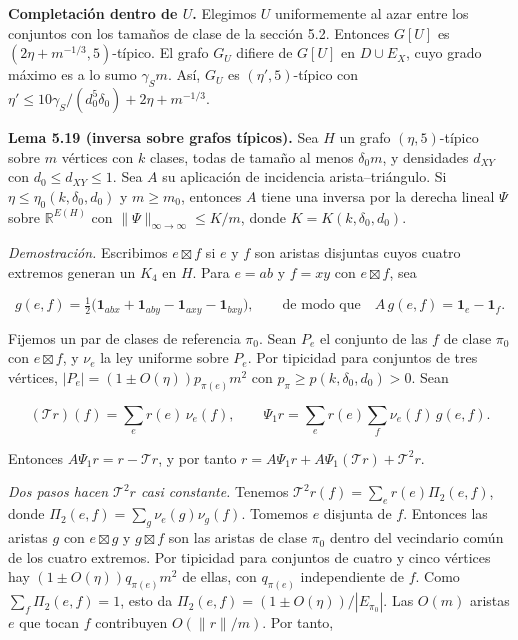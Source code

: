 \documentclass[spanish,11pt,a4paper]{article}
\begin{document}
\textbf{Completación dentro de \(U\).} Elegimos \(U\) uniformemente al azar entre los conjuntos con los tamaños de clase de la sección 5.2. Entonces \(G[U]\) es \((2\eta+m^{-1/3},5)\)-típico. El grafo \(G_U\) difiere de \(G[U]\) en \(D\cup E_X\), cuyo grado máximo es a lo sumo \(\gamma_Sm\). Así, \(G_U\) es \((\eta',5)\)-típico con \(\eta'\le10\gamma_S/(d_0^5\delta_0)+2\eta+m^{-1/3}\).

\textbf{Lema 5.19 (inversa sobre grafos típicos).} Sea \(H\) un grafo \((\eta,5)\)-típico sobre \(m\) vértices con \(k\) clases, todas de tamaño al menos \(\delta_0m\), y densidades \(d_{XY}\) con \(d_0\le d_{XY}\le1\). Sea \(A\) su aplicación de incidencia arista--triángulo. Si \(\eta\le\eta_0(k,\delta_0,d_0)\) y \(m\ge m_0\), entonces \(A\) tiene una inversa por la derecha lineal \(\Psi\) sobre \(\mathbb R^{E(H)}\) con \(\|\Psi\|_{\infty\to\infty}\le K/m\), donde \(K=K(k,\delta_0,d_0)\).

\emph{Demostración.} Escribimos \(e\boxtimes f\) si \(e\) y \(f\) son aristas disjuntas cuyos cuatro extremos generan un \(K_4\) en \(H\). Para \(e=ab\) y \(f=xy\) con \(e\boxtimes f\), sea

\nopagebreak[4]
\[g(e,f)=\tfrac12\bigl(\mathbf 1_{abx}+\mathbf 1_{aby}-\mathbf 1_{axy}-\mathbf 1_{bxy}\bigr),\qquad\text{de modo que}\quad A\,g(e,f)=\mathbf 1_e-\mathbf 1_f.\]

Fijemos un par de clases de referencia \(\pi_0\). Sean \(P_e\) el conjunto de las \(f\) de clase \(\pi_0\) con \(e\boxtimes f\), y \(\nu_e\) la ley uniforme sobre \(P_e\). Por tipicidad para conjuntos de tres vértices, \(|P_e|=(1\pm O(\eta))p_{\pi(e)}m^2\) con \(p_\pi\ge p(k,\delta_0,d_0)>0\). Sean

\nopagebreak[4]
\[(\mathcal Tr)(f)=\sum_e r(e)\,\nu_e(f),\qquad \Psi_1r=\sum_e r(e)\sum_f\nu_e(f)\,g(e,f).\]

Entonces \(A\Psi_1r=r-\mathcal Tr\), y por tanto \(r=A\Psi_1r+A\Psi_1(\mathcal Tr)+\mathcal T^2r\).

\emph{Dos pasos hacen \(\mathcal T^2r\) casi constante.} Tenemos \(\mathcal T^2r(f)=\sum_e r(e)\Pi_2(e,f)\), donde \(\Pi_2(e,f)=\sum_g\nu_e(g)\nu_g(f)\). Tomemos \(e\) disjunta de \(f\). Entonces las aristas \(g\) con \(e\boxtimes g\) y \(g\boxtimes f\) son las aristas de clase \(\pi_0\) dentro del vecindario común de los cuatro extremos. Por tipicidad para conjuntos de cuatro y cinco vértices hay \((1\pm O(\eta))q_{\pi(e)}m^2\) de ellas, con \(q_{\pi(e)}\) independiente de \(f\). Como \(\sum_f\Pi_2(e,f)=1\), esto da \(\Pi_2(e,f)=(1\pm O(\eta))/|E_{\pi_0}|\). Las \(O(m)\) aristas \(e\) que tocan \(f\) contribuyen \(O(\|r\|/m)\). Por tanto,
\end{document}
